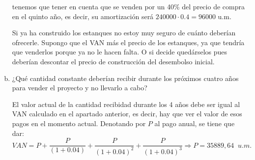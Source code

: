\documentclass[11pt]{article}
\theoremstyle{definition}
\theoremstyle{remark}
\begin{document}
\begin{enumerate}[(a)]
 tenemos que tener en cuenta que se venden por un 40\% del precio de compra en el quinto año, es decir, su amortización será $240000\cdot 0.4=96000$ u.m.
 
Si ya ha construido los estanques no estoy muy seguro de cuánto deberían ofrecerle. Supongo que el VAN más el precio de los estanques, ya que tendría que venderlos porque ya no le hacen falta. O si decide quedárselos pues deberían descontar el precio de construcción del desembolso inicial.

\item ¿Qué cantidad constante deberían recibir durante los próximos cuatro años para vender el proyecto y no llevarlo a cabo?

El valor actual de la cantidad recibidad durante los 4 años debe ser igual al VAN calculado en el apartado anterior, es decir, hay que ver el valor de esos pagos en el momento actual. Denotando por $P$ al pago anual, se tiene que dar:
\[
VAN=P+\frac{P}{(1+0.04)}+\frac{P}{(1+0.04)^2}+\frac{P}{(1+0.04)^3} \Rightarrow P=35889,64 \;\; u.m.
\]

\end{enumerate}
\end{document}
